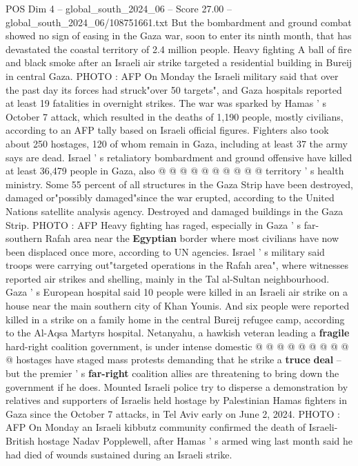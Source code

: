 \begin{textsample}{POS Dim 4 – global\_south\_2024\_06 – Score 27.00 – global\_south\_2024\_06/108751661.txt}
But the bombardment and ground combat showed no sign of easing in the Gaza war, soon to enter its ninth month, that has devastated the coastal territory of 2.4 million people.
Heavy fighting A ball of fire and black smoke after an Israeli air strike targeted a residential building in Bureij in central Gaza.
PHOTO : AFP On Monday the Israeli military said that over the past day its forces had struck"over 50 targets", and Gaza hospitals reported at least 19 fatalities in overnight strikes.
The war was sparked by Hamas ' s October 7 attack, which resulted in the deaths of 1,190 people, mostly civilians, according to an AFP tally based on Israeli official figures.
Fighters also took about 250 hostages, 120 of whom remain in Gaza, including at least 37 the army says are dead.
Israel ' s retaliatory bombardment and ground offensive have killed at least 36,479 people in Gaza, also @ @ @ @ @ @ @ @ @ @ territory ' s health ministry.
Some 55 percent of all structures in the Gaza Strip have been destroyed, damaged or"possibly damaged"since the war erupted, according to the United Nations satellite analysis agency.
Destroyed and damaged buildings in the Gaza Strip.
PHOTO : AFP Heavy fighting has raged, especially in Gaza ' s far-southern Rafah area near the \textbf{Egyptian} border where most civilians have now been displaced once more, according to UN agencies.
Israel ' s military said troops were carrying out"targeted operations in the Rafah area", where witnesses reported air strikes and shelling, mainly in the Tal al-Sultan neighbourhood.
Gaza ' s European hospital said 10 people were killed in an Israeli air strike on a house near the main southern city of Khan Younis.
And six people were reported killed in a strike on a family home in the central Bureij refugee camp, according to the Al-Aqsa Martyrs hospital.
Netanyahu, a hawkish veteran leading a \textbf{fragile} hard-right coalition government, is under intense domestic @ @ @ @ @ @ @ @ @ @ hostages have staged mass protests demanding that he strike a \textbf{truce} \textbf{deal} -- but the premier ' s \textbf{far-right} coalition allies are threatening to bring down the government if he does.
Mounted Israeli police try to disperse a demonstration by relatives and supporters of Israelis held hostage by Palestinian Hamas fighters in Gaza since the October 7 attacks, in Tel Aviv early on June 2, 2024.
PHOTO : AFP On Monday an Israeli kibbutz community confirmed the death of Israeli-British hostage Nadav Popplewell, after Hamas ' s armed wing last month said he had died of wounds sustained during an Israeli strike.

\end{textsample}
